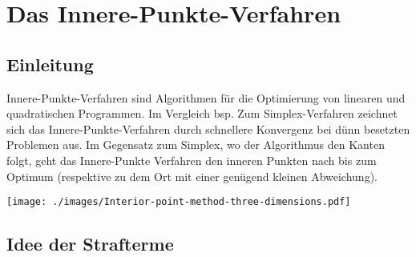 \section{Das Innere-Punkte-Verfahren}


\begin{minipage}[h]{0.7\textwidth}
\subsection{Einleitung}
Innere-Punkte-Verfahren sind Algorithmen für die Optimierung von linearen und quadratischen Programmen. Im Vergleich bsp. Zum Simplex-Verfahren zeichnet sich das Innere-Punkte-Verfahren durch schnellere Konvergenz bei dünn besetzten Problemen aus. Im Gegensatz zum Simplex, wo der Algorithmus den Kanten folgt, geht das Innere-Punkte Verfahren den inneren Punkten nach bis zum Optimum (respektive zu dem Ort mit einer genügend kleinen Abweichung).
\end{minipage}
\begin{minipage}[h]{0.3\textwidth} 
  \texttt{[image: ./images/Interior-point-method-three-dimensions.pdf]}
\end{minipage}\Uparrow

	
	
\subsection{Idee der Strafterme}

